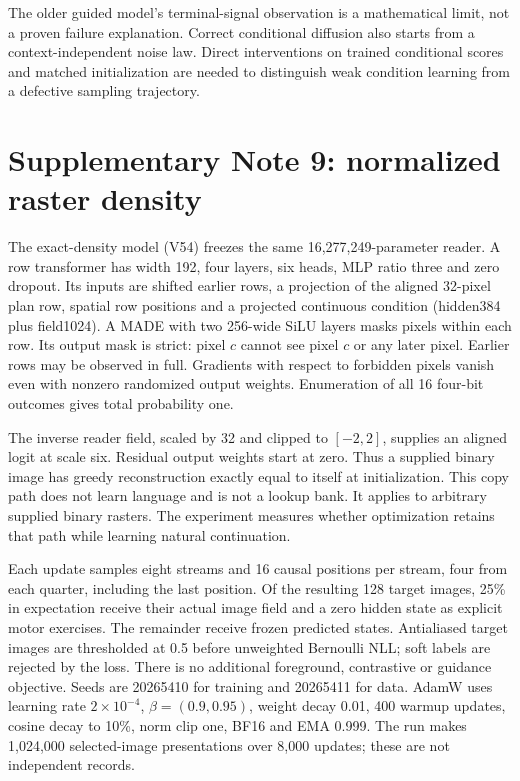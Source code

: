 \documentclass[10pt,a4paper]{article}
\begin{document}
The older guided model's terminal-signal observation is a mathematical limit,
not a proven failure explanation. Correct conditional diffusion also starts
from a context-independent noise law. Direct interventions on trained
conditional scores and matched initialization are needed to distinguish weak
condition learning from a defective sampling trajectory.

\section*{Supplementary Note 9: normalized raster density}
The exact-density model (V54) freezes the same 16,277,249-parameter reader.
A row transformer has width 192, four layers, six heads, MLP ratio three and
zero dropout. Its inputs are shifted earlier rows, a projection of the aligned
32-pixel plan row, spatial row positions and a projected continuous condition
(hidden384 plus field1024). A MADE with two 256-wide SiLU layers masks pixels
within each row. Its output mask is strict: pixel $c$ cannot see pixel $c$ or
any later pixel. Earlier rows may be observed in full. Gradients with respect
to forbidden pixels vanish even with nonzero randomized output weights.
Enumeration of all 16 four-bit outcomes gives total probability one.

The inverse reader field, scaled by 32 and clipped to $[-2,2]$, supplies an
aligned logit at scale six. Residual output weights start at zero. Thus a
supplied binary image has greedy reconstruction exactly equal to itself at
initialization. This copy path does not learn language and is not a lookup
bank. It applies to arbitrary supplied binary rasters. The experiment measures
whether optimization retains that path while learning natural continuation.

Each update samples eight streams and 16 causal positions per stream, four
from each quarter, including the last position. Of the resulting 128 target
images, 25\% in expectation receive their actual image field and a zero hidden
state as explicit motor exercises. The remainder receive frozen predicted
states. Antialiased target images are thresholded at 0.5 before unweighted
Bernoulli NLL; soft labels are rejected by the loss. There is no additional
foreground, contrastive or guidance objective. Seeds are 20265410 for training
and 20265411 for data. AdamW uses learning rate $2\times10^{-4}$,
$\beta=(0.9,0.95)$, weight decay 0.01, 400 warmup updates, cosine decay to
10\%, norm clip one, BF16 and EMA 0.999. The run makes 1,024,000 selected-image
presentations over 8,000 updates; these are not independent records.
\end{document}
